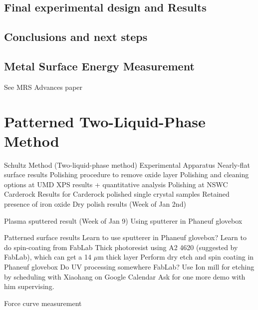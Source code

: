 \documentclass[12pt,letterpaper]{report}
\begin{document}
\section{Final experimental design and Results}\label{section2-3}


\section{Conclusions and next steps}\label{section2-4}



\section{Metal Surface Energy Measurement}\label{section2}

\begin{outline}[enumerate]
\1 See MRS Advances paper
	
\end{outline}

%


\chapter{Patterned Two-Liquid-Phase Method}\label{chapter3}

\begin{outline}[enumerate]
\1 Schultz Method (Two-liquid-phase method)
	\2 Experimental Apparatus
\1 Nearly-flat surface results
	\2 Polishing procedure to remove oxide layer
		\3 Polishing and cleaning options at UMD
			\4 XPS results + quantitative analysis
		\3 Polishing at NSWC Carderock
	\2 Results for Carderock polished single crystal samples
		\3 Retained presence of iron oxide
	\2 Dry polish results (Week of Jan 2nd)
	
	\2 Plasma sputtered result (Week of Jan 9)
		\3 Using sputterer in Phaneuf glovebox
		
\1 Patterned surface results
	\2 Learn to use sputterer in Phaneuf glovebox?
	\2 Learn to do spin-coating from FabLab
		\3 Thick photoresist using A2 4620 (suggested by FabLab), which can get a 14 $\mu$m thick layer
	\2 Perform dry etch and spin coating in Phaneuf glovebox
	\2 Do UV processing somewhere
		\3 FabLab?
	\2 Use Ion mill for etching by scheduling with Xiaohang on Google Calendar
		\3 Ask for one more demo with him supervising. 
	
\1 Force curve measurement
	
	
	
\end{outline}
\end{document}
